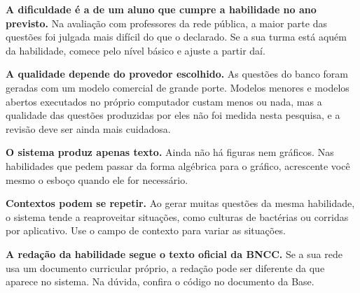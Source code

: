 \textbf{A dificuldade é a de um aluno que cumpre a habilidade no ano previsto.} Na avaliação com
professores da rede pública, a maior parte das questões foi julgada mais difícil do que o declarado.
Se a sua turma está aquém da habilidade, comece pelo nível básico e ajuste a partir daí.

\textbf{A qualidade depende do provedor escolhido.} As questões do banco foram geradas com um modelo
comercial de grande porte. Modelos menores e modelos abertos executados no próprio computador custam
menos ou nada, mas a qualidade das questões produzidas por eles não foi medida nesta pesquisa, e a
revisão deve ser ainda mais cuidadosa.

\textbf{O sistema produz apenas texto.} Ainda não há figuras nem gráficos. Nas habilidades que pedem
passar da forma algébrica para o gráfico, acrescente você mesmo o esboço quando ele for necessário.

\textbf{Contextos podem se repetir.} Ao gerar muitas questões da mesma habilidade, o sistema tende a
reaproveitar situações, como culturas de bactérias ou corridas por aplicativo. Use o campo de
contexto para variar as situações.

\textbf{A redação da habilidade segue o texto oficial da BNCC.} Se a sua rede usa um documento
curricular próprio, a redação pode ser diferente da que aparece no sistema. Na dúvida, confira o
código no documento da Base.
